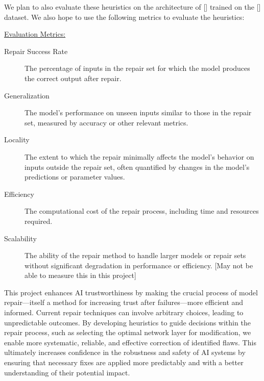 \documentclass{article}
\begin{document}
We plan to also evaluate these heuristics on the architecture of [] trained on the [] dataset.
We also hope to use the following metrics to evaluate the heuristics:

\underline{Evaluation Metrics:}
\begin{description}
    \item[Repair Success Rate] The percentage of inputs in the repair set for which the model produces the correct output after repair.
    \item[Generalization] The model's performance on unseen inputs similar to those in the repair set, measured by accuracy or other relevant metrics.
    \item[Locality] The extent to which the repair minimally affects the model's behavior on inputs outside the repair set, often quantified by changes in the model's predictions or parameter values.
    \item[Efficiency] The computational cost of the repair process, including time and resources required.
    \item[Scalability] The ability of the repair method to handle larger models or repair sets without significant degradation in performance or efficiency. [May not be able to measure this in this project]
\end{description}

This project enhances AI trustworthiness by making the crucial process of model repair—itself a method for increasing trust after failures—more efficient and informed. Current repair techniques can involve arbitrary choices, leading to unpredictable outcomes. By developing heuristics to guide decisions within the repair process, such as selecting the optimal network layer for modification, we enable more systematic, reliable, and effective correction of identified flaws. This ultimately increases confidence in the robustness and safety of AI systems by ensuring that necessary fixes are applied more predictably and with a better understanding of their potential impact.



\end{document}
